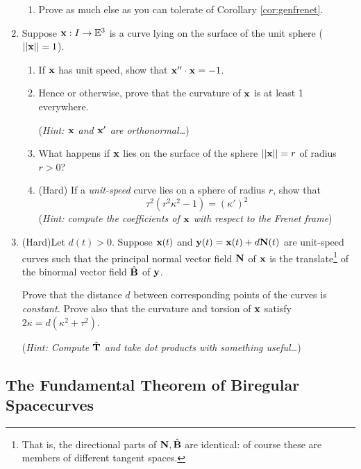 \begin{exercises}
\begin{enumerate}
\begin{enumerate}
	  	\item Prove as much else as you can tolerate of Corollary \ref{cor:genfrenet}.
	  \end{enumerate}
	
	  \item Suppose ${\mathbf{x}}:I\to\mathbb{E}^3$ is a curve lying on the surface of the unit sphere ($\left| \left| {\mathbf{x}}\right|\right|=1$).
	  \begin{enumerate}
	    \item If ${\mathbf{x}}$ has unit speed, show that ${\mathbf{x}}''\cdot{\mathbf{x}}=-1$.
	    
	    \item Hence or otherwise, prove that the curvature of ${\mathbf{x}}$ is at least 1 everywhere.\par
	    (\emph{Hint: ${\mathbf{x}}$ and ${\mathbf{x}}'$ are orthonormal\ldots})
	    
	    \item What happens if ${\mathbf{x}}$ lies on the surface of the sphere $\left| \left| {\mathbf{x}}\right|\right|=r$ of radius $r>0$?
	    
	    \item (Hard) If a \emph{unit-speed} curve lies on a sphere of radius $r$, show that
	    \[
	    	\tau^2(r^2\kappa^2-1)=(\kappa')^2
	    \]
	    (\emph{Hint: compute the coefficients of ${\mathbf{x}}$ with respect to the Frenet frame})
	  \end{enumerate}
	 
	
		\item (Hard)\quad Let $d(t)>0$. Suppose ${\mathbf{x}}(t)$ and ${\mathbf{y}}(t)={\mathbf{x}}(t)+d{\mathbf{N}}(t)$ are unit-speed curves such that the principal normal vector field ${\mathbf{N}}$ of ${\mathbf{x}}$ is the translate\footnote{That is, the directional parts of ${\mathbf{N}},\hat{{\mathbf{B}}}$ are identical: of course these are members of different tangent spaces.} of the binormal vector field $\hat{{\mathbf{B}}}$ of ${\mathbf{y}}$.\par
		Prove that the distance $d$ between corresponding points of the curves is \emph{constant.} Prove also that the curvature and torsion of ${\mathbf{x}}$ satisfy $2\kappa=d(\kappa^2+\tau^2)$.\par
		(\emph{Hint: Compute $\hat{{\mathbf{T}}}$ and take dot products with something useful\ldots})
	  
	\end{enumerate}
\end{exercises}

\clearpage



\subsection{The Fundamental Theorem of Biregular Spacecurves}



